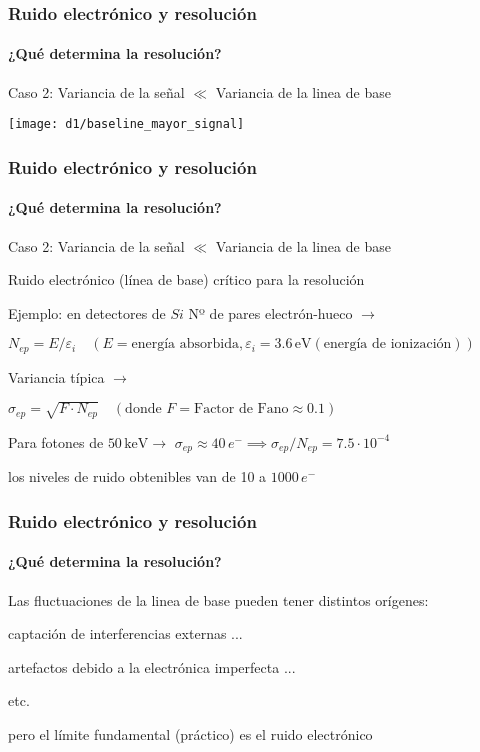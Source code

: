 \documentclass{beamer}
\begin{document}
\begin{frame}
\frametitle{Ruido electr\'onico y resoluci\'on}
\framesubtitle{¿Qu\'e determina la resoluci\'on?}
{\color{blue}Caso 2: Variancia de la señal $\ll$ Variancia de la linea de base} 
\begin{center}
\texttt{[image: d1/baseline\_mayor\_signal]} 
\end{center}
\end{frame} 

\begin{frame}
\frametitle{Ruido electr\'onico y resoluci\'on}
\framesubtitle{¿Qu\'e determina la resoluci\'on?}
{\color{blue}Caso 2: Variancia de la señal $\ll$ Variancia de la linea de base} 
\begin{alertblock}{}
Ruido electr\'onico (l\'inea de base) cr\'itico para la resoluci\'on
\end{alertblock}
\begin{block}{Ejemplo: \footnotesize{en detectores de $Si$}}
Nº de pares electr\'on-hueco $\rightarrow$
\begin{center}
$N_{ep} = E/\varepsilon_i \quad (E = \text{energ\'ia absorbida,}\, \varepsilon_i = 3.6\,\text{eV} (\text{energ\'ia de ionizaci\'on}))$ 
\end{center}

Variancia t\'ipica $\rightarrow$ 
\begin{center}
$\sigma_{ep} = \sqrt{F\cdot N_{ep}} \quad (\text{donde} \,\, F = \text{Factor de Fano} \approx 0.1)$
\end{center}

Para fotones de $50\,\text{keV} \rightarrow$
$\sigma_{ep} \approx 40\,e^- \implies
\sigma_{ep}/N_{ep} = 7.5\cdot10^{-4}$

\vspace{2mm}
\alert{los niveles de ruido obtenibles van de 10 a $1000\,e^-$}
\end{block}
\end{frame} 

\begin{frame}
\frametitle{Ruido electr\'onico y resoluci\'on}
\framesubtitle{¿Qu\'e determina la resoluci\'on?}
\begin{block}{}
Las fluctuaciones de la linea de base pueden tener distintos or\'igenes:

captaci\'on de interferencias externas ...

artefactos debido a la electr\'onica imperfecta ...

etc.

\alert{pero el l\'imite fundamental (pr\'actico) es el {\color{blue}ruido
electr\'onico}}
\end{block}
\end{frame} 
\end{document}
